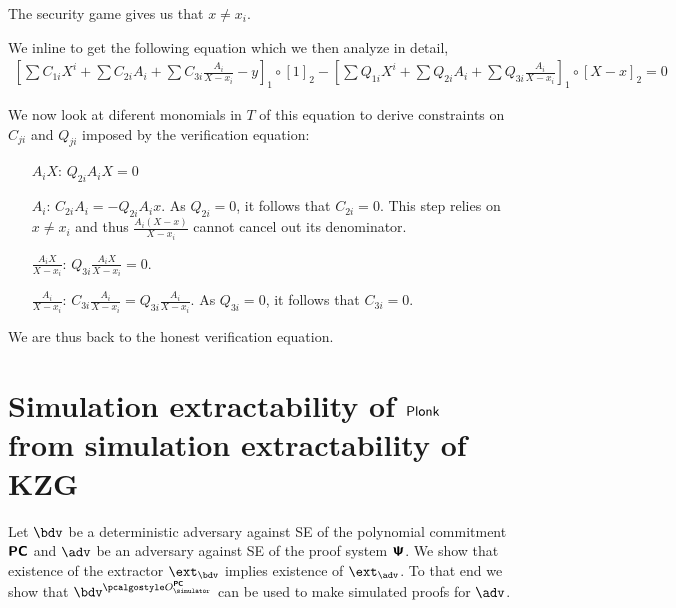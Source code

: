 \documentclass[runningheads,11pt]{llncs}
\begin{document}
The security game gives us that $x \neq x_{i}$.

We inline to get the following equation which we then analyze in detail,
\begin{align*}
  \left[\sum C_{1i} X^{i} + \sum C_{2i} A_{i} + \sum C_{3i} \frac{A_{i}}{X-x_{i}} - y\right]_{1} \circ [1]_{2} - \left[\sum Q_{1i} X^{i} + \sum Q_{2i} A_{i} + \sum Q_{3i} \frac{A_{i}}{X-x_{i}}\right]_{1} \circ [X-x]_{2} = 0
  \end{align*}

We now look at diferent monomials in $T$ of this equation to derive constraints on $C_{ji}$ and $Q_{ji}$ imposed by the verification equation:
\begin{itemize}
  \item[$A_{i}X$:] $Q_{2i} A_{i} X = 0$
  \item[$A_{i}$:] $C_{2i} A_{i} = - Q_{2i}A_{i} x$. As $Q_{2i}=0$, it follows
    that $C_{{2i}}=0$. This step relies on $x \neq x_{i}$ and thus
    $\frac{A_{i} (X-x)}{X-x_{i}}$ cannot cancel out its denominator.
  \item[$\frac{A_{i}X}{X-x_{i}}$:] $Q_{3i} \frac{A_{i} X}{X-x_{i}} = 0$.
  \item[$\frac{A_{i}}{X-x_{i}}$:]
    $C_{3i} \frac{A_{i}}{X-x_{i}} = Q_{{3i}} \frac{A_{i}}{X-x_{i}} $. As
    $Q_{3i}=0$, it follows that $C_{{3i}}=0$.
  \end{itemize}
We are thus back to the honest verification equation.

\section{Simulation extractability of $\textnormal{\textsf{Plonk}}$ from simulation extractability of
  KZG}
Let $\bdv$ be a deterministic adversary against SE of the polynomial commitment $\bm{\mathsf{PC}}$ and
$\adv$ be an adversary against SE of the proof system $\bm{\mathsf{\Psi}}$. We show that
existence of the extractor $\ext_\bdv$ implies existence of $\ext_\adv$. To that
end we show that $\bdv^{\oracles^{\PCOM}}$ can be used to make simulated proofs
for $\adv$.
\end{document}

